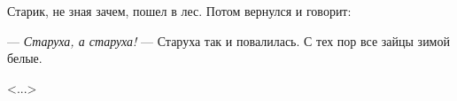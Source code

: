 Старик, не зная зачем, пошел в лес. Потом вернулся и говорит:

--- \textit{Старуха, а старуха!} --- Старуха так и повалилась. С тех пор все зайцы зимой белые.

\hfill <...>